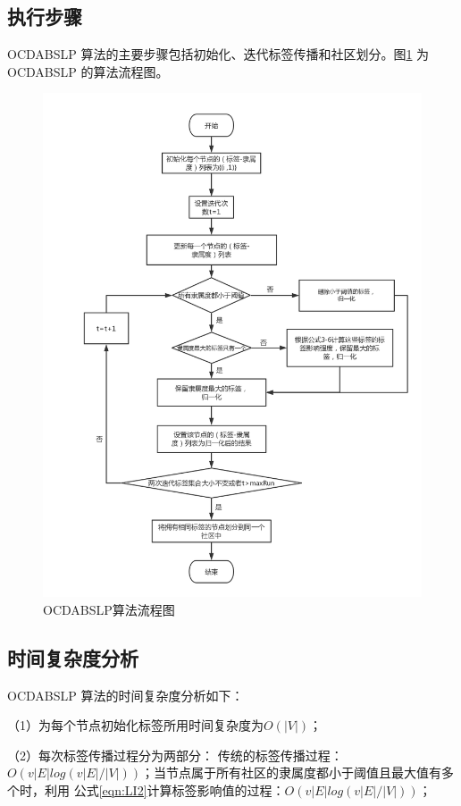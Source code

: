 \subsection{执行步骤}
OCDABSLP 算法的主要步骤包括初始化、迭代标签传播和社区划分。图\ref{fig:fig4-1}
为 OCDABSLP 的算法流程图。

\begin{figure}
  \centering
  \includegraphics[width=1\textwidth]{figures/fig4-1}
  \caption{OCDABSLP算法流程图}\label{fig:fig4-1}
\end{figure}

\subsection{时间复杂度分析}
OCDABSLP 算法的时间复杂度分析如下： 

（1）为每个节点初始化标签所用时间复杂度为$ O(|V|)$； 

（2）每次标签传播过程分为两部分： 传统的标签传播过程：$O(v|E|log(v|E|/|V|))$；当节点属于所有社区的隶属度都小于阈值且最大值有多个时，利用
公式\ref{eqn:LI2}计算标签影响值的过程：$O(v|E|log(v|E|/|V|))$； 

